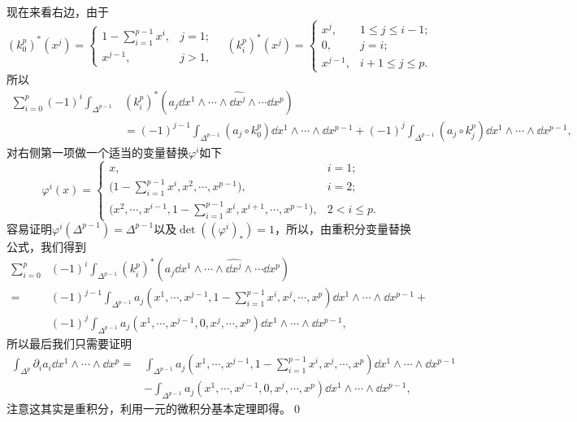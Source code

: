 现在来看右边，由于
\[(k^p_0)^*(x^j)=
\begin{cases}
	1-\sum_{i=1}^{p-1}x^i,& j =1;\\
	x^{j-1},& j>1,
\end{cases}\quad
(k^p_i)^*(x^j)=
\begin{cases}
	x^j,& 1\leq j \leq i-1;\\
	0,& j=i;\\
	x^{j-1},& i+1\leq j \leq p.
\end{cases}
\]
所以
\[
\begin{split}
	\sum_{i=0}^p(-1)^i\int_{\Delta^{p-1}}& (k^p_i)^*(a_j\dd x^1\wedge\cdots\wedge\widehat{\dd x^j}\wedge\cdots \dd x^p)\\
	&=(-1)^{j-1}\int_{\Delta^{p-1}} (a_j\circ k^p_0)\dd x^1\wedge\cdots \wedge\dd x^{p-1}+(-1)^j\int_{\Delta^{p-1}} (a_j\circ k_j^p)\dd x^1\wedge\cdots \wedge\dd x^{p-1},
\end{split}
\]
对右侧第一项做一个适当的变量替换$\varphi^i$如下
\[
	\varphi^i(x)=\begin{cases}
		x,& i=1;\\
		\bigl(1-\sum_{i=1}^{p-1}x^i,x^2,\cdots,x^{p-1}\bigr),& i=2;\\
		\bigl(x^2,\cdots,x^{i-1},1-\sum_{i=1}^{p-1}x^i,x^{i+1},\cdots,x^{p-1}\bigr),& 2<i\leq p.
	\end{cases}
\]
容易证明$\varphi^i(\Delta^{p-1})=\Delta^{p-1}$以及$\det ((\varphi^i)_*)=1$，所以，由重积分变量替换公式，我们得到
\[
\begin{split}
	\sum_{i=0}^p&(-1)^i\int_{\Delta^{p-1}} (k^p_i)^*(a_j\dd x^1\wedge\cdots\wedge\widehat{\dd x^j}\wedge\cdots \dd x^p)\\
	=&(-1)^{j-1}\int_{\Delta^{p-1}} a_j\left(x^1,\cdots,x^{j-1},1-\sum_{i=1}^{p-1}x^i,x^{j},\cdots,x^p\right)\dd x^1\wedge\cdots \wedge\dd x^{p-1}+\\
	&(-1)^{j}\int_{\Delta^{p-1}}a_j(x^1,\cdots,x^{j-1},0,x^{j},\cdots,x^p)\dd x^1\wedge\cdots \wedge\dd x^{p-1},
\end{split}
\]
所以最后我们只需要证明
\[
\begin{split}
	\int_{\Delta^{p}}\partial_i a_i\dd x^1\wedge\cdots \wedge\dd x^p=
	&\int_{\Delta^{p-1}} a_j\left(x^1,\cdots,x^{j-1},1-\sum_{i=1}^{p-1}x^i,x^{j},\cdots,x^p\right)\dd x^1\wedge\cdots \wedge\dd x^{p-1}\\
	&-\int_{\Delta^{p-1}}a_j(x^1,\cdots,x^{j-1},0,x^{j},\cdots,x^p)\dd x^1\wedge\cdots \wedge\dd x^{p-1},
\end{split}
\]
注意这其实是重积分，利用一元的微积分基本定理即得。\qed


